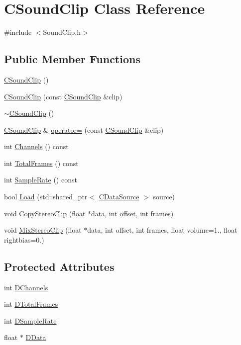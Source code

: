 \hypertarget{classCSoundClip}{}\section{C\+Sound\+Clip Class Reference}
\label{classCSoundClip}


{\ttfamily \#include $<$Sound\+Clip.\+h$>$}

\subsection*{Public Member Functions}
\begin{DoxyCompactItemize}
\item 
\hyperlink{classCSoundClip_af65407e991db78fb13c6e9fdec122dd6}{C\+Sound\+Clip} ()
\item 
\hyperlink{classCSoundClip_aa7f0a4b8587e351d3ecf952b28d4b9b3}{C\+Sound\+Clip} (const \hyperlink{classCSoundClip}{C\+Sound\+Clip} \&clip)
\item 
\hyperlink{classCSoundClip_a9c1ae390d4509c4d39610a624c2f61f5}{$\sim$\+C\+Sound\+Clip} ()
\item 
\hyperlink{classCSoundClip}{C\+Sound\+Clip} \& \hyperlink{classCSoundClip_a4ab9ebe61c3b5ee9545e1167e53faeb3}{operator=} (const \hyperlink{classCSoundClip}{C\+Sound\+Clip} \&clip)
\item 
int \hyperlink{classCSoundClip_acd59c59e307ae3e251a9b40c752fe467}{Channels} () const
\item 
int \hyperlink{classCSoundClip_abcd12e4989ecf6f31011e65c27c994f9}{Total\+Frames} () const
\item 
int \hyperlink{classCSoundClip_ac89dc3d2f25a43fcd97268ec9828f709}{Sample\+Rate} () const
\item 
bool \hyperlink{classCSoundClip_a4b8a88d0062844969cbe1ab763c3590a}{Load} (std\+::shared\+\_\+ptr$<$ \hyperlink{classCDataSource}{C\+Data\+Source} $>$ source)
\item 
void \hyperlink{classCSoundClip_a9cc8dd683c638331b2d0532aa68149da}{Copy\+Stereo\+Clip} (float $\ast$data, int offset, int frames)
\item 
void \hyperlink{classCSoundClip_a54fb05ee6936503af55650b10c861967}{Mix\+Stereo\+Clip} (float $\ast$data, int offset, int frames, float volume=1., float rightbias=0.)
\end{DoxyCompactItemize}
\subsection*{Protected Attributes}
\begin{DoxyCompactItemize}
\item 
int \hyperlink{classCSoundClip_a01aaf0b87b9b8226c77a6931d03d6a64}{D\+Channels}
\item 
int \hyperlink{classCSoundClip_ab0d9eb261d09fa2a106658276f37285b}{D\+Total\+Frames}
\item 
int \hyperlink{classCSoundClip_ac1b9306140da2f89f6178833e0a9b887}{D\+Sample\+Rate}
\item 
float $\ast$ \hyperlink{classCSoundClip_a220921a0c81e5c63e2cd3c55c75878b1}{D\+Data}
\end{DoxyCompactItemize}



